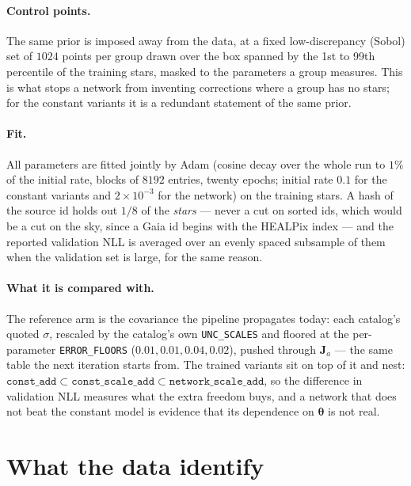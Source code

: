 \documentclass[11pt,a4paper]{article}
\newcommand{\bv}[1]{\boldsymbol{#1}}          %
\newcommand{\bM}[1]{\boldsymbol{#1}}          %
\begin{document}
\paragraph{Control points.} The same prior is imposed away from the data, at a
fixed low-discrepancy (Sobol) set of $1024$ points per group drawn over the box
spanned by the 1st to 99th percentile of the training stars, masked to the
parameters a group measures. This is what stops a network from inventing
corrections where a group has no stars; for the constant variants it is a
redundant statement of the same prior.

\paragraph{Fit.} All parameters are fitted jointly by Adam (cosine decay over the
whole run to $1\%$ of the initial rate, blocks of $8192$ entries, twenty epochs;
initial rate $0.1$ for the constant variants and $2\times10^{-3}$ for the
network) on the training stars. A hash of the source id holds out $1/8$ of the
\emph{stars} --- never a cut on sorted ids, which would be a cut on the sky, since
a Gaia id begins with the HEALPix index --- and the reported validation NLL is
averaged over an evenly spaced subsample of them when the validation set is
large, for the same reason.

\paragraph{What it is compared with.} The reference arm is the covariance the
pipeline propagates today: each catalog's quoted $\sigma$, rescaled by the
catalog's own \texttt{UNC\_SCALES} and floored at the per-parameter
\texttt{ERROR\_FLOORS} ($0.01,0.01,0.04,0.02$), pushed through $\bM J_a$ --- the
same table the next iteration starts from. The trained variants sit on top of it
and nest: $\texttt{const\_add}\subset\texttt{const\_scale\_add}\subset
\texttt{network\_scale\_add}$, so the difference in validation NLL measures what
the extra freedom buys, and a network that does not beat the constant model is
evidence that its dependence on $\bv\theta$ is not real.

\section{What the data identify}
\label{sec:ident}
\end{document}
